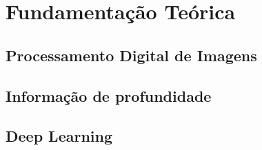 


\chapter{Fundamentação Teórica}

\section{Processamento Digital de Imagens}

\section{Informação de profundidade}

\section{Deep Learning}

\section{}
